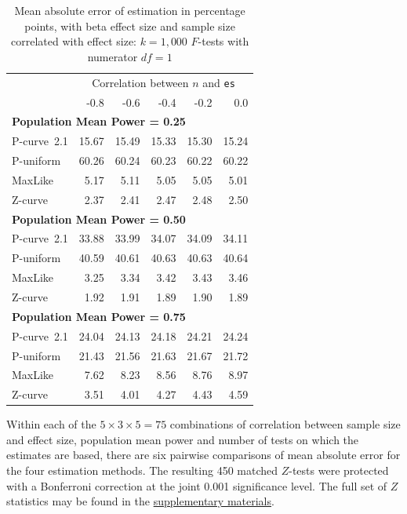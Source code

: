 \documentclass[jou]{apa6} %
\begin{document}
\begin{table}[h]
\caption{Mean absolute error of estimation in percentage points, with beta effect size and sample size correlated with effect size: $k = 1,000$ $F$-tests with numerator $df=1$}
{\small
\begin{center}
\begin{tabular}{lrrrrr}  \hline
      & \multicolumn{5}{c}{Correlation between $n$ and \texttt{es}} \\
      &  -0.8 & -0.6 & -0.4 & -0.2 & 0.0 \\ \hline
\multicolumn{6}{l}{\textbf{Population Mean Power = 0.25}} \\ \hline
P-curve~2.1   & 15.67  & 15.49  & 15.33  & 15.30  & 15.24 \\
P-uniform & 60.26  & 60.24  & 60.23  & 60.22  & 60.22 \\
MaxLike   &  5.17  &  5.11  &  5.05  &  5.05  &  5.01 \\
Z-curve   &  2.37  &  2.41  &  2.47  &  2.48  &  2.50 \\ \hline
\multicolumn{6}{l}{\textbf{Population Mean Power = 0.50}} \\ \hline
P-curve~2.1   & 33.88  & 33.99  & 34.07  & 34.09  & 34.11 \\
P-uniform & 40.59  & 40.61  & 40.63  & 40.63  & 40.64 \\
MaxLike   &  3.25  &  3.34  &  3.42  &  3.43  &  3.46 \\
Z-curve   &  1.92  &  1.91  &  1.89  &  1.90  &  1.89 \\ \hline
\multicolumn{6}{l}{\textbf{Population Mean Power = 0.75}} \\ \hline
P-curve~2.1   & 24.04  & 24.13  & 24.18  & 24.21  & 24.24 \\
P-uniform & 21.43  & 21.56  & 21.63  & 21.67  & 21.72 \\
MaxLike   &  7.62  &  8.23  &  8.56  &  8.76  &  8.97 \\
Z-curve   &  3.51  &  4.01  &  4.27  &  4.43  &  4.59 \\ \hline
\end{tabular}
\end{center}
} %
\label{betacorrabserr}  %
\end{table}

Within each of the $5 \times 3 \times 5 = 75$ combinations of correlation between sample size and effect size, population mean power and number of tests on which the estimates are based, there are six pairwise comparisons of mean absolute error for the four estimation methods. The resulting 450 matched $Z$-tests were protected with a Bonferroni correction at the joint 0.001 significance level. The full set of $Z$ statistics may be found in the \href{http://www.utstat.toronto.edu/~brunner/zcurve2018} {supplementary materials}. 
\end{document}
